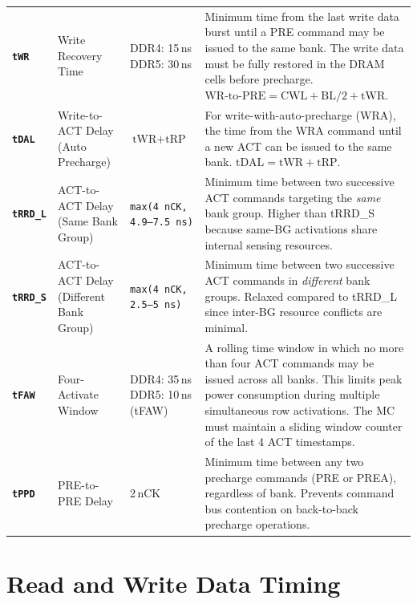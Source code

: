 \documentclass[11pt,a4paper]{article}
\newcommand{\sym}[1]{\texttt{\textbf{#1}}}
\begin{document}
\begin{longtable}{L{2.2cm} L{4.8cm} L{3.5cm} L{4cm}}
\sym{tWR} & Write Recovery Time & DDR4: 15\,ns \newline DDR5: 30\,ns &
  Minimum time from the last write data burst until a PRE command may be issued to the same bank.
  The write data must be fully restored in the DRAM cells before precharge.
  $\text{WR-to-PRE} = \text{CWL} + \text{BL/2} + \text{tWR}$. \\

\sym{tDAL} & Write-to-ACT Delay (Auto Precharge) & $\text{tWR} + \text{tRP}$ &
  For write-with-auto-precharge (WRA), the time from the WRA command until a new ACT can be issued 
  to the same bank. $\text{tDAL} = \text{tWR} + \text{tRP}$. \\

\sym{tRRD\_L} & ACT-to-ACT Delay (Same Bank Group) & \texttt{max(4\,nCK, 4.9--7.5\,ns)} &
  Minimum time between two successive ACT commands targeting the \textit{same} bank group.
  Higher than tRRD\_S because same-BG activations share internal sensing resources. \\

\sym{tRRD\_S} & ACT-to-ACT Delay (Different Bank Group) & \texttt{max(4\,nCK, 2.5--5\,ns)} &
  Minimum time between two successive ACT commands in \textit{different} bank groups.
  Relaxed compared to tRRD\_L since inter-BG resource conflicts are minimal. \\

\sym{tFAW} & Four-Activate Window & DDR4: 35\,ns \newline DDR5: 10\,ns (tFAW) &
  A rolling time window in which no more than four ACT commands may be issued across all banks.
  This limits peak power consumption during multiple simultaneous row activations.
  The MC must maintain a sliding window counter of the last 4 ACT timestamps. \\

\sym{tPPD} & PRE-to-PRE Delay & 2\,nCK &
  Minimum time between any two precharge commands (PRE or PREA), regardless of bank.
  Prevents command bus contention on back-to-back precharge operations. \\
\end{longtable}

\section{Read and Write Data Timing}
\end{document}
